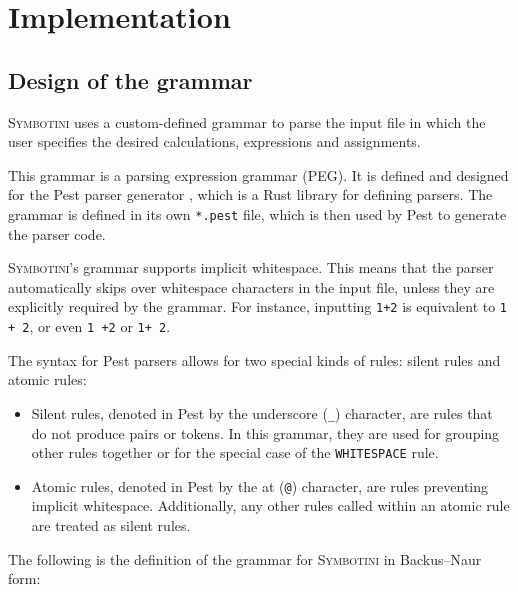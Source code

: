 \chapter{Implementation}\label{chap:implementation}

\lstset{language=Rust, style=colouredRust, numbers=none}

\section{Design of the grammar}\label{sec:design-of-the-grammar}

\textsc{Symbotini} uses a custom-defined grammar to parse the input file in which the user specifies the desired calculations, expressions and assignments.

This grammar is a parsing expression grammar (PEG). It is defined and designed for the Pest parser generator \parencite{pest-book}, which is a Rust library for defining parsers. The grammar is defined in its own \verb|*.pest| file, which is then used by Pest to generate the parser code.

\textsc{Symbotini}'s grammar supports implicit whitespace. This means that the parser automatically skips over whitespace characters in the input file, unless they are explicitly required by the grammar. For instance, inputting \verb|1+2| is equivalent to \verb|1 + 2|, or even \verb|1 +2| or \verb|1+ 2|.

The syntax for Pest parsers allows for two special kinds of rules: silent rules and atomic rules:

\begin{itemize}
    \item Silent rules, denoted in Pest by the underscore (\verb|_|) character, are rules that do not produce pairs or tokens. In this grammar, they are used for grouping other rules together or for the special case of the \verb|WHITESPACE| rule.
    \item Atomic rules, denoted in Pest by the at (\verb|@|) character, are rules preventing implicit whitespace. Additionally, any other rules called within an atomic rule are treated as silent rules.
\end{itemize}

The following is the definition of the grammar for \textsc{Symbotini} in Backus--Naur form:

